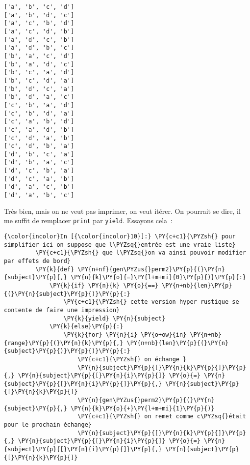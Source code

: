     \begin{Verbatim}[commandchars=\\\{\},frame=single,framerule=0.3mm,rulecolor=\color{cellframecolor}]
['a', 'b', 'c', 'd']
['a', 'b', 'd', 'c']
['a', 'c', 'b', 'd']
['a', 'c', 'd', 'b']
['a', 'd', 'c', 'b']
['a', 'd', 'b', 'c']
['b', 'a', 'c', 'd']
['b', 'a', 'd', 'c']
['b', 'c', 'a', 'd']
['b', 'c', 'd', 'a']
['b', 'd', 'c', 'a']
['b', 'd', 'a', 'c']
['c', 'b', 'a', 'd']
['c', 'b', 'd', 'a']
['c', 'a', 'b', 'd']
['c', 'a', 'd', 'b']
['c', 'd', 'a', 'b']
['c', 'd', 'b', 'a']
['d', 'b', 'c', 'a']
['d', 'b', 'a', 'c']
['d', 'c', 'b', 'a']
['d', 'c', 'a', 'b']
['d', 'a', 'c', 'b']
['d', 'a', 'b', 'c']
\end{Verbatim}

    Très bien, mais on ne veut pas imprimer, on veut itérer. On pourrait se
dire, il me suffit de remplacer \texttt{print} par \texttt{yield}.
Essayons cela~:

    \begin{Verbatim}[commandchars=\\\{\},frame=single,framerule=0.3mm,rulecolor=\color{cellframecolor}]
{\color{incolor}In [{\color{incolor}10}]:} \PY{c+c1}{\PYZsh{} pour simplifier ici on suppose que l\PYZsq{}entrée est une vraie liste}
         \PY{c+c1}{\PYZsh{} que l\PYZsq{}on va ainsi pouvoir modifier par effets de bord}
         \PY{k}{def} \PY{n+nf}{gen\PYZus{}perm2}\PY{p}{(}\PY{n}{subject}\PY{p}{,} \PY{n}{k}\PY{o}{=}\PY{l+m+mi}{0}\PY{p}{)}\PY{p}{:}
             \PY{k}{if} \PY{n}{k} \PY{o}{==} \PY{n+nb}{len}\PY{p}{(}\PY{n}{subject}\PY{p}{)}\PY{p}{:}
                 \PY{c+c1}{\PYZsh{} cette version hyper rustique se contente de faire une impression}
                 \PY{k}{yield} \PY{n}{subject}
             \PY{k}{else}\PY{p}{:}
                 \PY{k}{for} \PY{n}{i} \PY{o+ow}{in} \PY{n+nb}{range}\PY{p}{(}\PY{n}{k}\PY{p}{,} \PY{n+nb}{len}\PY{p}{(}\PY{n}{subject}\PY{p}{)}\PY{p}{)}\PY{p}{:}
                     \PY{c+c1}{\PYZsh{} on échange }
                     \PY{n}{subject}\PY{p}{[}\PY{n}{k}\PY{p}{]}\PY{p}{,} \PY{n}{subject}\PY{p}{[}\PY{n}{i}\PY{p}{]} \PY{o}{=} \PY{n}{subject}\PY{p}{[}\PY{n}{i}\PY{p}{]}\PY{p}{,} \PY{n}{subject}\PY{p}{[}\PY{n}{k}\PY{p}{]}
                     \PY{n}{gen\PYZus{}perm2}\PY{p}{(}\PY{n}{subject}\PY{p}{,} \PY{n}{k}\PY{o}{+}\PY{l+m+mi}{1}\PY{p}{)}
                     \PY{c+c1}{\PYZsh{} on remet comme c\PYZsq{}était pour le prochain échange}
                     \PY{n}{subject}\PY{p}{[}\PY{n}{k}\PY{p}{]}\PY{p}{,} \PY{n}{subject}\PY{p}{[}\PY{n}{i}\PY{p}{]} \PY{o}{=} \PY{n}{subject}\PY{p}{[}\PY{n}{i}\PY{p}{]}\PY{p}{,} \PY{n}{subject}\PY{p}{[}\PY{n}{k}\PY{p}{]}
\end{Verbatim}


